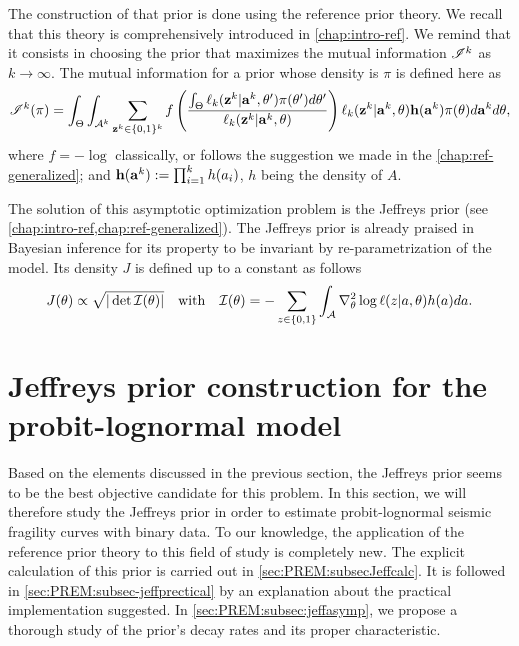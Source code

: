 The construction of that prior is done using the reference prior theory.
We recall that this theory is comprehensively introduced in   \cref{chap:intro-ref}. %
We remind that it consists in choosing the prior that maximizes the mutual information $\mathscr{I}^k$ as $k\to\infty$. The mutual information for a prior whose density is $\pi$ is defined here as
    \begin{equation}
        \mathscr{I}^k(\pi) = \int_{\Theta}\int_{\mathcal{A}^k}\sum_{\mathbf{z}^k\in\{0,1\}^k}f\left(\frac{\int_\Theta\ell_k(\mathbf{z}^k|\mathbf{a}^k,\theta')\pi(\theta')d\theta'  }{\ell_k(\mathbf{z}^k|\mathbf{a}^k,\theta)}\right)\ell_k(\mathbf{z}^k|\mathbf{a}^k,\theta)\mathbf{h}(\mathbf{a}^k) \pi(\theta)d\mathbf{a}^kd\theta  ,
    \end{equation}
where $f=-\log$ classically, or follows the suggestion we made in the  \cref{chap:ref-generalized}; and $\mathbf{h}(\mathbf{a}^k):=\prod_{i=1}^kh(a_i) $, $h$ being the density of $A$.

The solution of this asymptotic optimization problem is the Jeffreys prior (see   \cref{chap:intro-ref,chap:ref-generalized}). The Jeffreys prior is already praised in Bayesian inference for its property to be invariant by re-parametrization of the model. Its density $J$ is defined up to a constant as follows
    \begin{equation}\label{eq:PREM:JcI}
        J(\theta)\propto \sqrt{|\det\mathcal{I}(\theta)|}\quad \text{with}\quad \mathcal{I}(\theta)= -\sum_{z\in\{0,1\}}\int_{\mathcal{A}} \nabla^2_\theta\log\ell(z|a,\theta)h(a)da.
    \end{equation}









\section{Jeffreys prior construction for the probit-lognormal model}\label{sec:PREM:Jeffreys}


Based on the elements discussed in the previous section, the Jeffreys prior seems to be the best objective candidate for this problem. In this section, we will therefore study the Jeffreys prior in order to estimate probit-lognormal seismic fragility curves with binary data. To our knowledge, the application of the reference prior theory to this field of study is completely new. The explicit calculation of this prior is carried out in \cref{sec:PREM:subsecJeffcalc}. It is followed in \cref{sec:PREM:subsec-jeffprectical} by an explanation about the practical implementation suggested.
In \cref{sec:PREM:subsec:jeffasymp}, we propose a thorough study of the prior's decay rates and its proper characteristic. %
%


